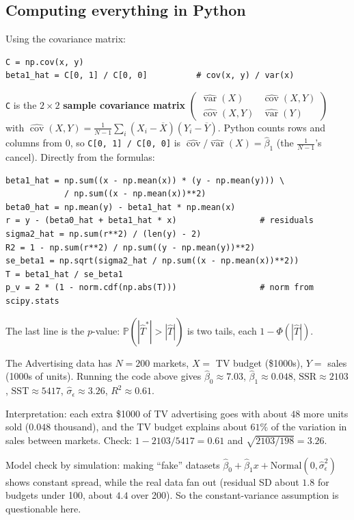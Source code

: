 \documentclass[11pt]{article}
\newcommand{\Var}{\operatorname{var}}
\newcommand{\Cov}{\operatorname{cov}}
\renewcommand{\P}{\mathbb{P}}
\newcommand{\Norm}{\text{Normal}}
\newcommand{\SSR}{\mathrm{SSR}}
\newcommand{\SST}{\mathrm{SST}}
\newcommand{\py}[1]{\texttt{#1}}
\newcommand{\Ybar}{\overline{Y}}
\newcommand{\Xbar}{\overline{X}}
\begin{document}
\subsection{Computing everything in Python}
Using the covariance matrix:
\begin{lstlisting}
C = np.cov(x, y)
beta1_hat = C[0, 1] / C[0, 0]          # cov(x, y) / var(x)
\end{lstlisting}
\py{C} is the $2\times2$ \textbf{sample covariance matrix}
$\begin{pmatrix}\widehat{\Var}(X)&\widehat{\Cov}(X,Y)\\\widehat{\Cov}(X,Y)&\widehat{\Var}(Y)\end{pmatrix}$ with
$\widehat{\Cov}(X,Y)=\frac{1}{N-1}\sum_i(X_i-\Xbar)(Y_i-\Ybar)$. Python counts rows and columns from $0$, so \py{C[0, 1] / C[0, 0]}
is $\widehat{\Cov}/\widehat{\Var}(X)=\hat\beta_1$ (the $\frac1{N-1}$'s cancel). Directly from the formulas:
\begin{lstlisting}
beta1_hat = np.sum((x - np.mean(x)) * (y - np.mean(y))) \
            / np.sum((x - np.mean(x))**2)
beta0_hat = np.mean(y) - beta1_hat * np.mean(x)
r = y - (beta0_hat + beta1_hat * x)                 # residuals
sigma2_hat = np.sum(r**2) / (len(y) - 2)
R2 = 1 - np.sum(r**2) / np.sum((y - np.mean(y))**2)
se_beta1 = np.sqrt(sigma2_hat / np.sum((x - np.mean(x))**2))
T = beta1_hat / se_beta1
p_v = 2 * (1 - norm.cdf(np.abs(T)))                 # norm from scipy.stats
\end{lstlisting}
The last line is the $p$-value: $\P(|\hat T^*|>|\hat T|)$ is two tails, each $1-\Phi(|\hat T|)$.

\begin{examplebox}[title={Example (notes): TV advertising and sales}]
The Advertising data has $N=200$ markets, $X=$ TV budget (\$1000s), $Y=$ sales (1000s of units). Running the code above gives
$\hat\beta_0\approx7.03$, $\hat\beta_1\approx0.048$, $\SSR\approx2103$, $\SST\approx5417$, $\hat\sigma_\epsilon\approx3.26$, $R^2\approx0.61$.

Interpretation: each extra \$1000 of TV advertising goes with about $48$ more units sold ($0.048$ thousand), and the TV budget explains
about $61\%$ of the variation in sales between markets. Check: $1-2103/5417=0.61$ and $\sqrt{2103/198}=3.26$.

Model check by simulation: making ``fake'' datasets $\hat\beta_0+\hat\beta_1x+\Norm(0,\hat\sigma_\epsilon^2)$ shows constant spread, while the
real data fan out (residual SD about $1.8$ for budgets under 100, about $4.4$ over 200). So the constant-variance assumption is questionable here.
\end{examplebox}
\end{document}
